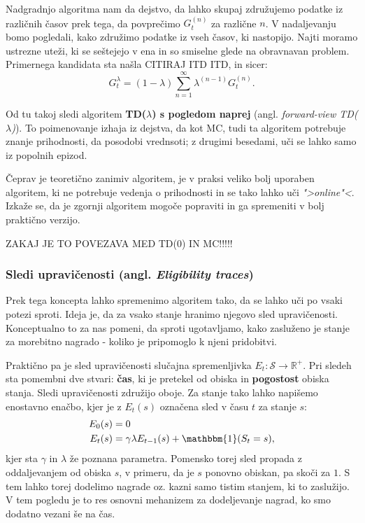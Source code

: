 \documentclass[12pt,a4paper]{amsart}
\theoremstyle{definition} %
\theoremstyle{plain} %
\begin{document}
Nadgradnjo algoritma nam da dejstvo, da lahko skupaj združujemo podatke iz različnih časov prek 
tega, da povprečimo $G_t^{(n)}$ za različne $n$. V nadaljevanju bomo pogledali, kako združimo 
podatke iz vseh časov, ki nastopijo. Najti moramo ustrezne uteži, ki se seštejejo v ena in so 
smiselne glede na obravnavan problem. Primernega kandidata sta našla CITIRAJ ITD ITD, in sicer:
$$
G_t^\lambda = (1 - \lambda) \sum_{n=1}^\infty \lambda^{(n-1)} G_t^{(n)}.
$$

Od tu takoj sledi algoritem \textbf{TD($\lambda$) s pogledom naprej} (angl. \textit{forward-view 
TD($\lambda$)}). To poimenovanje izhaja iz dejstva, da kot MC, tudi ta algoritem potrebuje znanje
prihodnosti, da posodobi vrednsoti; z drugimi besedami, uči se lahko samo iz popolnih epizod.

Čeprav je teoretično zanimiv algoritem, je v praksi veliko bolj uporaben algoritem, ki ne potrebuje
vedenja o prihodnosti in se tako lahko uči \textit{">online"<}. Izkaže se, da je zgornji algoritem 
mogoče popraviti in ga spremeniti v bolj praktično verzijo.

ZAKAJ JE TO POVEZAVA MED TD(0) IN MC!!!!!

\subsubsection{Sledi upravičenosti (angl. \textit{Eligibility traces})}
Prek tega koncepta lahko spremenimo algoritem tako, da se lahko uči po vsaki potezi sproti. Ideja 
je, da za vsako stanje hranimo njegovo sled upravičenosti. Konceptualno to za nas pomeni, da sproti 
ugotavljamo, kako zasluženo je stanje za morebitno nagrado - koliko je pripomoglo k njeni 
pridobitvi.

Praktično pa je sled upravičenosti slučajna spremenljivka $E_t: \mathcal{S} \rightarrow \mathbb{R}^+$. 
Pri sledeh sta pomembni dve stvari: \textbf{čas}, ki je pretekel od obiska in \textbf{pogostost} 
obiska stanja. Sledi upravičenosti združijo oboje. Za stanje tako lahko napišemo enostavno enačbo, 
kjer je z $E_t(s)$ označena sled v času $t$ za stanje $s$:
\begin{align*}
    E_0(s) &= 0 \\
    E_t(s) &= \gamma \lambda E_{t-1}(s) + \mathbbm{1}(S_t = s),
\end{align*}
kjer sta $\gamma$ in $\lambda$ že poznana parametra. Pomensko torej sled propada z oddaljevanjem 
od obiska $s$, v primeru, da je $s$ ponovno obiskan, pa skoči za $1$. S tem lahko torej dodelimo 
nagrade oz. kazni samo tistim stanjem, ki to zaslužijo. V tem pogledu je to res osnovni mehanizem 
za dodeljevanje nagrad, ko smo dodatno vezani še na čas.
\end{document}
